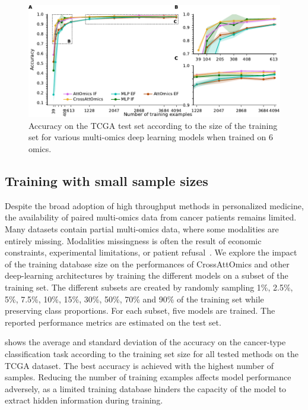 \documentclass[../main.tex]{subfiles}
\begin{document}
     \begin{figure}[htbp]
         \centering
         \includegraphics{limited_training_6_omics.pdf}
         \caption{Accuracy on the TCGA test set according to the size of the training set for various multi-omics deep learning models when trained on 6 omics.}
         \label{fig:lim_train_6_omics}
     \end{figure}
 \subsection{Training with small sample sizes}
     Despite the broad adoption of high throughput methods in personalized medicine, the availability of paired multi-omics data from cancer patients remains limited.
     Many datasets contain partial multi-omics data, where some modalities are entirely missing.
     Modalities missingness is often the result of economic constraints, experimental limitations, or patient refusal~\cite{Kang2021}.
     We explore the impact of the training database size on the performances of CrossAttOmics and other deep-learning architectures by training the different models on a subset of the training set.
     The different subsets are created by randomly sampling 1\%, 2.5\%, 5\%, 7.5\%, 10\%, 15\%, 30\%, 50\%, 70\% and 90\% of the training set while preserving class proportions.
     For each subset, five models are trained.
     The reported performance metrics are estimated on the test set.

      shows the average and standard deviation of the accuracy on the cancer-type classification task according to the training set size for all tested methods on the TCGA dataset.
     The best accuracy is achieved with the highest number of samples.
     Reducing the number of training examples affects model performance adversely, as a limited training database hinders the capacity of the model to extract hidden information during training.
\end{document}
